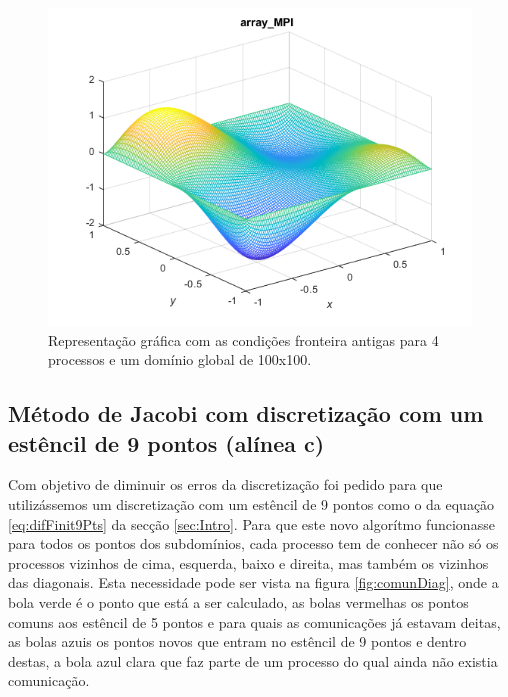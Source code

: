 \documentclass[10pt]{extarticle}
\begin{document}
  \begin{figure}[H]
  \centering
  \includegraphics[width=\linewidth/2]{alineaa.png}
  \caption{Representação gráfica com as condições fronteira antigas para 4 processos e um domínio global de 100x100.}
  \label{fig:newCondFront}
  \end{figure}

\pagebreak

\subsection{Método de Jacobi com discretização com um estêncil de 9 pontos (alínea c)}

Com objetivo de diminuir os erros da discretização foi pedido para que utilizássemos um discretização com um estêncil de 9 pontos como o da equação \ref{eq:difFinit9Pts} da secção \ref{sec:Intro}. Para que este novo algorítmo funcionasse para todos os pontos dos subdomínios, cada processo tem de conhecer não só os processos vizinhos de cima, esquerda, baixo e direita, mas também os vizinhos das diagonais. Esta necessidade pode ser vista na figura \ref{fig:comunDiag}, onde a bola verde é o ponto que está a ser calculado, as bolas vermelhas os pontos comuns aos estêncil de 5 pontos e para quais as comunicações já estavam deitas, as bolas azuis os pontos novos que entram no estêncil de 9 pontos e dentro destas, a bola azul clara que faz parte de um processo do qual ainda não existia comunicação.
\end{document}
